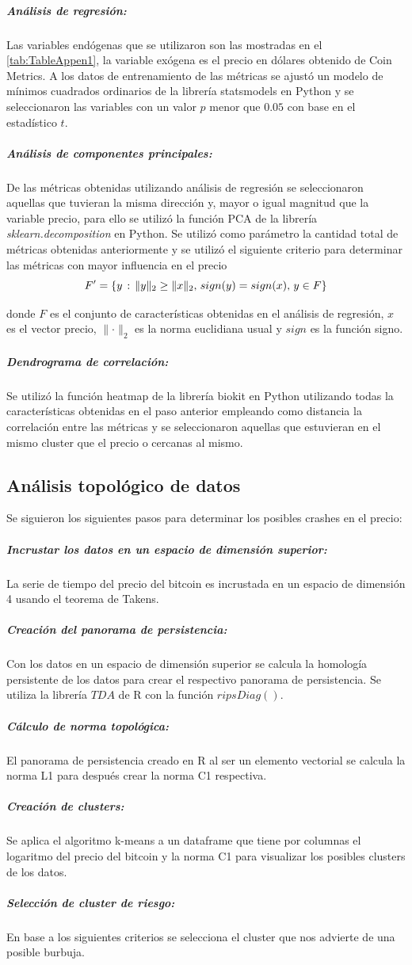 \subparagraph{Análisis de regresión:}
\label{AR}
Las variables endógenas que se utilizaron son las mostradas en el \autoref{tab:TableAppen1}, la variable exógena es el precio en dólares obtenido de Coin Metrics. 
A los datos de entrenamiento de las métricas se ajustó un modelo de mínimos cuadrados ordinarios de la librería statsmodels en Python y se seleccionaron las variables con un valor $p$ menor que $0.05$ con base en el estadístico $t$.


\subparagraph{Análisis de componentes principales:}
\label{PCA}

De las métricas obtenidas utilizando análisis de regresión se seleccionaron aquellas que tuvieran la misma dirección y, mayor o igual magnitud que la variable precio, para ello se utilizó la función PCA de la librería \emph{sklearn.decomposition} en Python.
Se utilizó como parámetro la cantidad total de métricas obtenidas anteriormente y se utilizó el siguiente criterio para determinar las métricas con mayor influencia en el precio
\[ F^{\prime} = \{ y \hspace{0.5mm}:\hspace{0.5mm} \lVert y \rVert_2 \geq \lVert x \rVert_2,\hspace{0.5mm} sign(y) = sign(x),\hspace{0.5mm}y \in F\} \]

donde $F$ es el conjunto de características obtenidas en el análisis de regresión, $x$ es el vector precio, $\lVert \cdot \rVert_2$ es la norma euclidiana usual y $sign$ es la función signo.

\subparagraph{Dendrograma de correlación:}
Se utilizó la función heatmap de la librería biokit en Python utilizando todas la características obtenidas en el paso anterior empleando como distancia la correlación entre las métricas y se seleccionaron aquellas que estuvieran en el mismo cluster que el precio o cercanas al mismo.

\subsection{Análisis topológico de datos}
Se siguieron los siguientes pasos para determinar los posibles crashes en el precio:

\subparagraph{Incrustar los datos en un espacio de dimensión superior:} La serie de tiempo del precio del bitcoin es incrustada en un espacio de dimensión 4 usando el teorema de Takens.
\subparagraph{Creación del panorama de persistencia:} Con los datos en un espacio de dimensión superior se calcula la homología persistente de los datos para crear el respectivo panorama de persistencia. Se utiliza la librería $TDA$ de R con la función $ripsDiag()$.
\subparagraph{Cálculo de norma topológica:} El panorama de persistencia creado en R al ser un elemento vectorial se calcula la norma L1 para después crear la norma C1 respectiva.
\subparagraph{Creación de clusters:} Se aplica el algoritmo k-means a un dataframe que tiene por columnas el logaritmo del precio del bitcoin y la norma C1 para visualizar los posibles clusters de los datos.
\subparagraph{Selección de cluster de riesgo:} En base a los siguientes criterios se selecciona el cluster que nos advierte de una posible burbuja. 

